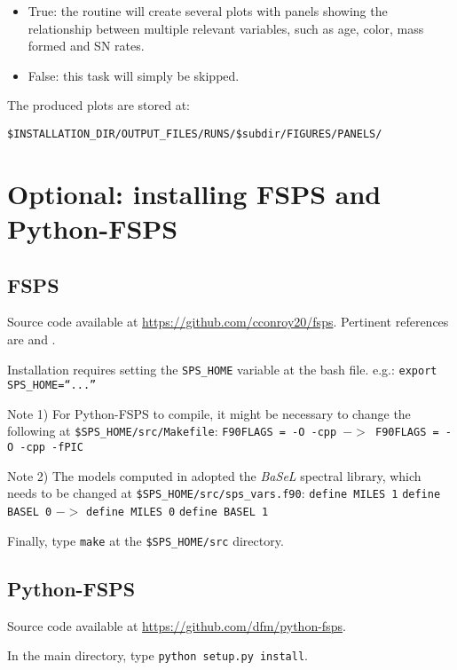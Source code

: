 \documentclass[manuscript]{aastex}
\begin{document}
\begin{itemize}
\item True: the routine will create several plots with panels showing the relationship between multiple relevant variables, such as age, color, mass formed and SN rates.
\item False: this task will simply be skipped.
\end{itemize}

The produced plots are stored at: 

\texttt{\$INSTALLATION\_DIR/OUTPUT\_FILES/RUNS/\$subdir/FIGURES/PANELS/}

\section{Optional: installing FSPS and Python-FSPS}
\label{sec:optional}

\subsection{FSPS}
\label{subsec:fsps}

Source code available at \href{https://github.com/cconroy20/fsps}{https://github.com/cconroy20/fsps}. Pertinent references are \citet{Conroy2009_fspsI} and \citet{Conroy2010_fspsII}.
      
Installation requires setting the \texttt{SPS\_HOME} variable at the
bash file. e.g.: \texttt{export SPS\_HOME=``...''}

Note 1) For Python-FSPS to compile, it might be necessary to change the following at \texttt{\$SPS\_HOME/src/Makefile}:
\texttt{F90FLAGS = -O -cpp $->$ F90FLAGS = -O -cpp -fPIC}

Note 2) The models computed in \citet{Heringer2017_DTD} adopted the \textit{BaSeL} spectral library, which needs to be changed at \texttt{\$SPS\_HOME/src/sps\_vars.f90}:
\texttt{define MILES 1}
\texttt{define BASEL 0}
$->$
\texttt{define MILES 0}
\texttt{define BASEL 1}

Finally, type \texttt{make} at the \texttt{\$SPS\_HOME/src} directory.

\subsection{Python-FSPS}
\label{subsec:Python-fsps}

Source code available at \href{https://github.com/dfm/python-fsps}{https://github.com/dfm/python-fsps}.

In the main directory, type \texttt{python setup.py install}.
\end{document}
